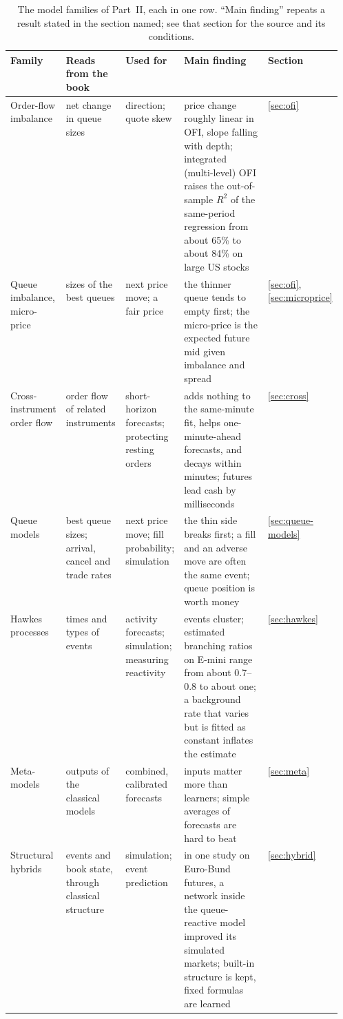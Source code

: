 \begin{table}[!htbp]
\centering\footnotesize
\caption{The model families of Part~II, each in one row. ``Main finding'' repeats a result stated in the section
named; see that section for the source and its conditions.}
\label{tab:part2-summary}
\setlength{\tabcolsep}{3pt}
\begin{tabularx}{\linewidth}{>{\raggedright\arraybackslash}p{0.14\linewidth}>{\raggedright\arraybackslash}p{0.18\linewidth}>{\raggedright\arraybackslash}p{0.16\linewidth}>{\raggedright\arraybackslash}X>{\raggedright\arraybackslash}p{0.08\linewidth}}
\toprule
Family & Reads from the book & Used for & Main finding & Section \\
\midrule
Order-flow imbalance & net change in queue sizes & direction; quote skew & price change roughly linear in OFI, slope falling with depth; integrated (multi-level) OFI raises the out-of-sample $R^2$ of the same-period regression from about 65\% to about 84\% on large US stocks & \ref{sec:ofi} \\
Queue imbalance, micro-price & sizes of the best queues & next price move; a fair price & the thinner queue tends to empty first; the micro-price is the expected future mid given imbalance and spread & \ref{sec:ofi}, \ref{sec:microprice} \\
Cross-instrument order flow & order flow of related instruments & short-horizon forecasts; protecting resting orders & adds nothing to the same-minute fit, helps one-minute-ahead forecasts, and decays within minutes; futures lead cash by milliseconds & \ref{sec:cross} \\
Queue models & best queue sizes; arrival, cancel and trade rates & next price move; fill probability; simulation & the thin side breaks first; a fill and an adverse move are often the same event; queue position is worth money & \ref{sec:queue-models} \\
Hawkes processes & times and types of events & activity forecasts; simulation; measuring reactivity & events cluster; estimated branching ratios on E-mini range from about 0.7--0.8 to about one; a background rate that varies but is fitted as constant inflates the estimate & \ref{sec:hawkes} \\
Meta-models & outputs of the classical models & combined, calibrated forecasts & inputs matter more than learners; simple averages of forecasts are hard to beat & \ref{sec:meta} \\
Structural hybrids & events and book state, through classical structure & simulation; event prediction & in one study on Euro-Bund futures, a network inside the queue-reactive model improved its simulated markets; built-in structure is kept, fixed formulas are learned & \ref{sec:hybrid} \\

\end{tabularx}
\end{table}
